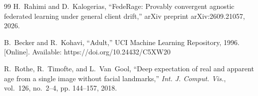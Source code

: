 \documentclass{article}
\theoremstyle{definition}
\begin{document}
\begin{thebibliography}{99}
H.~Rahimi and D.~Kalogerias, ``FedeRage: Provably convergent agnostic
federated learning under general client drift,'' arXiv preprint
arXiv:2609.21057, 2026.

B.~Becker and R.~Kohavi, ``Adult,'' UCI Machine Learning Repository, 1996.
[Online]. Available: https://doi.org/10.24432/C5XW20

R.~Rothe, R.~Timofte, and L.~Van~Gool, ``Deep expectation of real and apparent
age from a single image without facial landmarks,'' \emph{Int. J. Comput.
Vis.}, vol.~126, no.~2--4, pp. 144--157, 2018.

\end{thebibliography}
\end{document}
